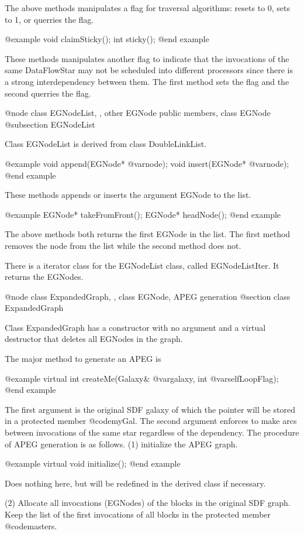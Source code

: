 The above methods manipulates a flag for traversal algorithms: resets to 0,
sets to 1, or querries the flag.

@example
void claimSticky();
int sticky();
@end example

These methods manipulates another flag to indicate that the invocations
of the same DataFlowStar may not be scheduled into different processors
since there is a strong interdependency between them. The first method
sets the flag and the second querries the flag.

@node class EGNodeList, , other EGNode public members, class EGNode
@subsection EGNodeList

Class EGNodeList is derived from class DoubleLinkList. 

@example
void append(EGNode* @var{node});
void insert(EGNode* @var{node});
@end example

These methods appends or inserts the argument EGNode to the list.

@example
EGNode* takeFromFront();
EGNode* headNode();
@end example

The above methods both returns the first EGNode in the list. The first method
removes the node from the list while the second method does not.

There is a iterator class for the EGNodeList class, called EGNodeListIter.
It returns the EGNodes.

@node class ExpandedGraph, , class EGNode, APEG generation
@section class ExpandedGraph

Class ExpandedGraph has a constructor with no argument and a virtual
destructor that deletes all EGNodes in the graph. 

The major method to generate an APEG is 

@example
virtual int createMe(Galaxy& @var{galaxy}, int @var{selfLoopFlag});
@end example

The first argument is the original SDF galaxy of which the pointer will
be stored in a protected member @code{myGal}. The second argument
enforces to make arcs between invocations of the same star regardless
of the dependency. The procedure of APEG generation is as follows.
(1) initialize the APEG graph.

@example
virtual void initialize();
@end example

Does nothing here, but will be redefined in the derived class if necessary.

(2) Allocate all invocations (EGNodes) of the blocks in the original SDF
graph. Keep the list of the first invocations of all blocks in the protected
member @code{masters}. 

